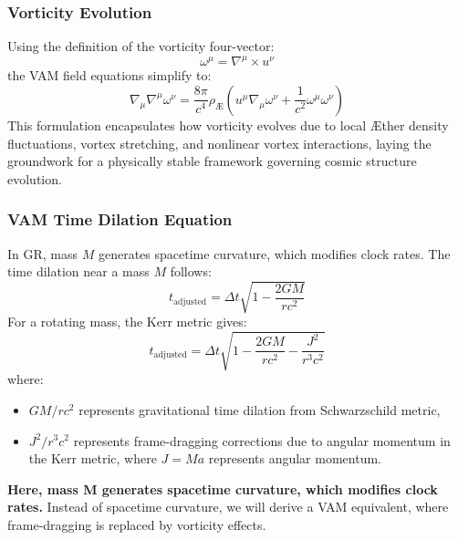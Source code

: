 \subsubsection*{Vorticity Evolution}
Using the definition of the vorticity four-vector:
\begin{equation}
    \omega^\mu = \nabla^\mu \times u^\nu
\end{equation}
the VAM field equations simplify to:
\begin{equation}
    \nabla_\mu \nabla^\mu \omega^\nu = \frac{8\pi}{c^4} \rho_{\text{\AE}} \left( u^\mu \nabla_\mu \omega^\nu + \frac{1}{c^2} \omega^\mu \omega^\nu \right)
\end{equation}
This formulation encapsulates how vorticity evolves due to local \AE ther density fluctuations, vortex stretching, and nonlinear vortex interactions, laying the groundwork for a physically stable framework governing cosmic structure evolution.

\subsubsection*{VAM Time Dilation Equation}
In GR, mass $M$ generates spacetime curvature, which modifies clock rates. The time dilation near a mass $M$ follows:
\begin{equation}
    t_{\text{adjusted}} = \Delta t \sqrt{1 - \frac{2GM}{rc^2}}
\end{equation}
For a rotating mass, the Kerr metric gives:
\begin{equation}
    t_{\text{adjusted}} = \Delta t \sqrt{1 - \frac{2GM}{r c^2} - \frac{J^2}{r^3 c^2}}
\end{equation}
where:
\begin{itemize}
    \item $GM/r c^2$ represents gravitational time dilation from Schwarzschild metric,
    \item $J^2/r^3 c^2$ represents frame-dragging corrections due to angular momentum in the Kerr metric, where $J = M a$ represents angular momentum.
\end{itemize}

\textbf{Here, mass M generates spacetime curvature, which modifies clock rates.}
Instead of spacetime curvature, we will derive a VAM equivalent, where frame-dragging is replaced by vorticity effects.

